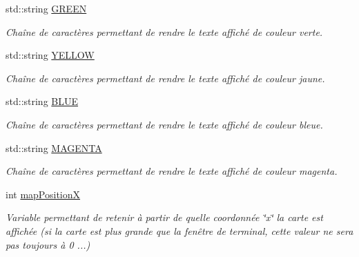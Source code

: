 \begin{DoxyCompactItemize}
\mbox{\label{namespaceio_a38fffa22831731f5fc0b72700dc75c87}} 
std\+::string \hyperlink{namespaceio_a38fffa22831731f5fc0b72700dc75c87}{G\+R\+E\+EN}
\begin{DoxyCompactList}\small\item\em Chaîne de caractères permettant de rendre le texte affiché de couleur verte. \end{DoxyCompactList}\item 
\mbox{\label{namespaceio_a0bb7c89e9e48840601811e4e35421767}} 
std\+::string \hyperlink{namespaceio_a0bb7c89e9e48840601811e4e35421767}{Y\+E\+L\+L\+OW}
\begin{DoxyCompactList}\small\item\em Chaîne de caractères permettant de rendre le texte affiché de couleur jaune. \end{DoxyCompactList}\item 
\mbox{\label{namespaceio_aad76ed62886e76ca53a755d1c917e387}} 
std\+::string \hyperlink{namespaceio_aad76ed62886e76ca53a755d1c917e387}{B\+L\+UE}
\begin{DoxyCompactList}\small\item\em Chaîne de caractères permettant de rendre le texte affiché de couleur bleue. \end{DoxyCompactList}\item 
\mbox{\label{namespaceio_a1e4a43cea85f576e62aebce6aabc60b5}} 
std\+::string \hyperlink{namespaceio_a1e4a43cea85f576e62aebce6aabc60b5}{M\+A\+G\+E\+N\+TA}
\begin{DoxyCompactList}\small\item\em Chaîne de caractères permettant de rendre le texte affiché de couleur magenta. \end{DoxyCompactList}\item 
\mbox{\label{namespaceio_a7f2af984af03881a45da957db2c48be2}} 
int \hyperlink{namespaceio_a7f2af984af03881a45da957db2c48be2}{map\+PositionX}
\begin{DoxyCompactList}\small\item\em Variable permettant de retenir à partir de quelle coordonnée \char`\"{}x\char`\"{} la carte est affichée (si la carte est plus grande que la fenêtre de terminal, cette valeur ne sera pas toujours à 0 ...) \end{DoxyCompactList}\item 

\end{DoxyCompactItemize}
